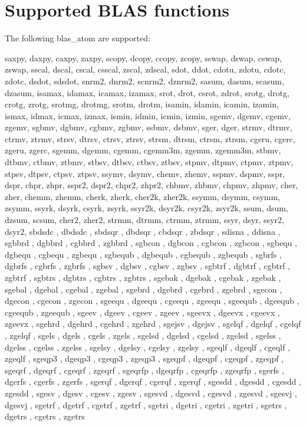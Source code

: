 \documentclass{article}
\begin{document}
\section{Supported BLAS functions}

The following blas\_atom are supported:

saxpy,    daxpy,    caxpy,    zaxpy,    scopy,    dcopy,    ccopy,    zcopy,    sswap,    dswap,    cswap,    zswap,    sscal,    dscal,    cscal,    csscal,    zscal,    zdscal,    sdot,    ddot,    cdotu,    zdotu,    cdotc,    zdotc,    dsdot,    sdsdot,    snrm2,    dnrm2,    scnrm2,    dznrm2,    sasum,    dasum,    scasum,    dzasum,    isamax,    idamax,    icamax,    izamax,    srot,    drot,    csrot,    zdrot,    srotg,    drotg,    crotg,    zrotg,    srotmg,    drotmg,    srotm,    drotm,    isamin,    idamin,    icamin,    izamin,    ismax,    idmax,    icmax,    izmax,    ismin,    idmin,    icmin,    izmin,    sgemv,    dgemv,    cgemv,    zgemv,    sgbmv,    dgbmv,    cgbmv,    zgbmv,    ssbmv,    dsbmv,    sger,    dger,    strmv,    dtrmv,    ctrmv,    ztrmv,    strsv,    dtrsv,    ctrsv,    ztrsv,    strsm,    dtrsm,    ctrsm,    ztrsm,    cgeru,    cgerc,    zgeru,    zgerc,    sgemm,    dgemm,    cgemm,    cgemm3m,    zgemm,    zgemm3m,    stbmv,    dtbmv,    ctbmv,    ztbmv,    stbsv,    dtbsv,    ctbsv,    ztbsv,    stpmv,    dtpmv,    ctpmv,    ztpmv,    stpsv,    dtpsv,    ctpsv,    ztpsv,    ssymv,    dsymv,    chemv,    zhemv,    sspmv,    dspmv,    sspr,    dspr,    chpr,    zhpr,    sspr2,    dspr2,    chpr2,    zhpr2,    chbmv,    zhbmv,    chpmv,    zhpmv,    cher,    zher,    chemm,    zhemm,    cherk,    zherk,    cher2k,    zher2k,    ssymm,    dsymm,    csymm,    zsymm,    ssyrk,    dsyrk,    csyrk,    zsyrk,    ssyr2k,    dsyr2k,    csyr2k,    zsyr2k,    ssum,    dsum,    dzsum,    scsum,    cher2,    zher2,    strmm,    dtrmm,    ctrmm,    ztrmm,    ssyr,    dsyr,    ssyr2,    dsyr2, sbdsdc , dbdsdc , sbdsqr , dbdsqr , cbdsqr , zbdsqr , sdisna , ddisna , sgbbrd , dgbbrd , cgbbrd , zgbbrd , sgbcon , dgbcon , cgbcon , zgbcon , sgbequ , dgbequ , cgbequ , zgbequ , sgbequb , dgbequb , cgbequb , zgbequb , sgbrfs , dgbrfs , cgbrfs , zgbrfs , sgbsv , dgbsv , cgbsv , zgbsv , sgbtrf , dgbtrf , cgbtrf , zgbtrf , sgbtrs , dgbtrs , cgbtrs , zgbtrs , sgebak , dgebak , cgebak , zgebak , sgebal , dgebal , cgebal , zgebal , sgebrd , dgebrd , cgebrd , zgebrd , sgecon , dgecon , cgecon , zgecon , sgeequ , dgeequ , cgeequ , zgeequ , sgeequb , dgeequb , cgeequb , zgeequb , sgeev , dgeev , cgeev , zgeev , sgeevx , dgeevx , cgeevx , zgeevx , sgehrd , dgehrd , cgehrd , zgehrd , sgejsv , dgejsv , sgelqf , dgelqf , cgelqf , zgelqf , sgels , dgels , cgels , zgels , sgelsd , dgelsd , cgelsd , zgelsd , sgelss , dgelss , cgelss , zgelss , sgelsy , dgelsy , cgelsy , zgelsy , sgeqlf , dgeqlf , cgeqlf , zgeqlf , sgeqp3 , dgeqp3 , cgeqp3 , zgeqp3 , sgeqpf , dgeqpf , cgeqpf , zgeqpf , sgeqrf , dgeqrf , cgeqrf , zgeqrf , sgeqrfp , dgeqrfp , cgeqrfp , zgeqrfp , sgerfs , dgerfs , cgerfs , zgerfs , sgerqf , dgerqf , cgerqf , zgerqf , sgesdd , dgesdd , cgesdd , zgesdd , sgesv , dgesv , cgesv , zgesv , sgesvd , dgesvd , cgesvd , zgesvd , sgesvj , dgesvj , sgetrf , dgetrf , cgetrf , zgetrf , sgetri , dgetri , cgetri , zgetri , sgetrs , dgetrs , cgetrs , zgetrs 
\end{document}

